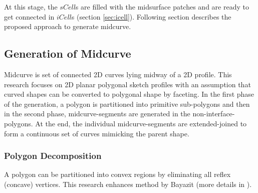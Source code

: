 	
	

At this stage, the $sCell$s are filled with the midsurface patches and are ready to get connected in $iCell$s (section \ref{sec:icell}). Following section describes the proposed approach to generate midcurve.

\subsection{Generation of Midcurve} \label{sec:midcurve}
Midcurve is set of connected 2D curves lying midway of a 2D profile. This research focuses on 2D planar polygonal sketch profiles with an assumption that curved shapes can be converted to polygonal shape by faceting. In the first  phase of the generation, a  polygon is partitioned into primitive sub-polygons and then in the second phase, midcurve-segments are generated in the non-interface-polygons.  At the end, the individual midcurve-segments  are extended-joined to form a continuous set of curves mimicking the parent shape. 




\subsubsection{Polygon Decomposition}
A polygon can be partitioned into convex regions by eliminating all reflex (concave) vertices. This research enhances method by  Bayazit\cite{Bayazit} (more details in \cite{YogeshETES2014} \cite{YogeshIJCAET2017}).


\def\partitioncomparisionraise{0.08}
\def\partitioncomparisionfig{0.98}

